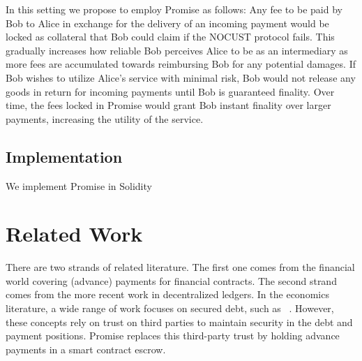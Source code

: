 \documentclass[runningheads]{llncs}
\newcommand{\sys}{Promise\xspace}
\newcommand{\tolgu}[1]{\todo[linecolor=yellow,backgroundcolor=yellow!25,bordercolor=yellow,inline,caption={}]{Todo for Lewis: #1}}
\begin{document}
In this setting we propose to employ \sys as follows: Any fee to be paid by Bob to Alice in exchange for the delivery of an incoming payment would be locked as collateral that Bob could claim if the NOCUST protocol fails. This gradually increases how reliable Bob perceives Alice to be as an intermediary as more fees are accumulated towards reimbursing Bob for any potential damages. If Bob wishes to utilize Alice's service with minimal risk, Bob would not release any goods in return for incoming payments until Bob is guaranteed finality. Over time, the fees locked in \sys would grant Bob instant finality over larger payments, increasing the utility of the service.

\subsection{Implementation}

We implement \sys in Solidity


\section{Related Work}
\label{sec:related}




There are two strands of related literature.
The first one comes from the financial world covering (advance) payments for financial contracts.
The second strand comes from the more recent work in decentralized ledgers.
In the economics literature, a wide range of work focuses on secured debt, such as ~\cite{scott1977bankruptcy,stulz1985analysis}.
However, these concepts rely on trust on third parties to maintain security in the debt and payment positions.
\sys replaces this third-party trust by holding advance payments in a smart contract escrow.
\end{document}
